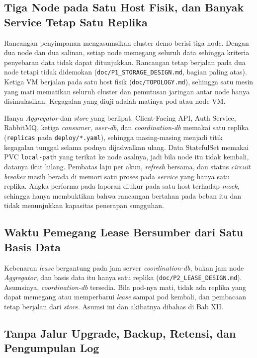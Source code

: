 \subsection{Tiga Node pada Satu Host Fisik, dan Banyak Service Tetap Satu Replika}

Rancangan penyimpanan mengasumsikan cluster demo berisi tiga node. Dengan dua node dan dua salinan, setiap node memegang seluruh data sehingga kriteria penyebaran data tidak dapat ditunjukkan. Rancangan tetap berjalan pada dua node tetapi tidak didemokan (\texttt{doc/P1\_STORAGE\_DESIGN.md}, bagian paling atas). Ketiga VM berjalan pada satu host fisik (\texttt{doc/TOPOLOGY.md}), sehingga satu mesin yang mati mematikan seluruh cluster dan pemutusan jaringan antar node hanya disimulasikan. Kegagalan yang diuji adalah matinya pod atau node VM.

Hanya \textit{Aggregator} dan \textit{store} yang berlipat. Client-Facing API, Auth Service, RabbitMQ, ketiga \textit{consumer}, \textit{user-db}, dan \textit{coordination-db} memakai satu replika (\texttt{replicas} pada \texttt{deploy/*.yaml}), sehingga masing-masing menjadi titik kegagalan tunggal selama podnya dijadwalkan ulang. Data StatefulSet memakai PVC \texttt{local-path} yang terikat ke node asalnya, jadi bila node itu tidak kembali, datanya ikut hilang. Pembatas laju per akun, \textit{refresh} bersama, dan status \textit{circuit breaker} masih berada di memori satu proses pada \textit{service} yang hanya satu replika. Angka performa pada laporan diukur pada satu host terhadap \textit{mock}, sehingga hanya membuktikan bahwa rancangan bertahan pada beban itu dan tidak menunjukkan kapasitas penerapan sungguhan.

\subsection{Waktu Pemegang Lease Bersumber dari Satu Basis Data}

Kebenaran \textit{lease} bergantung pada jam server \textit{coordination-db}, bukan jam node \textit{Aggregator}, dan basis data itu hanya satu replika (\texttt{doc/P2\_LEASE\_DESIGN.md}). Asumsinya, \textit{coordination-db} tersedia. Bila pod-nya mati, tidak ada replika yang dapat memegang atau memperbarui \textit{lease} sampai pod kembali, dan pembacaan tetap berjalan dari \textit{store}. Asumsi ini dan akibatnya dibahas di Bab XII.

\subsection{Tanpa Jalur Upgrade, Backup, Retensi, dan Pengumpulan Log}


